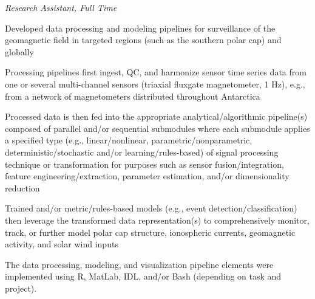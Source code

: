  \par
\textit{Research Assistant, Full Time}
\vspace{-0.8em}
\begin{itemize*}
  \item Developed data processing and modeling pipelines for
    surveillance of the geomagnetic field in targeted regions (such as
    the southern polar cap) and globally
  \item Processing pipelines first ingest, QC, and harmonize sensor time series data
    from one or several multi-channel sensors (triaxial fluxgate 
    magnetometer, 1 Hz), e.g., from a network of magnetometers 
    distributed throughout Antarctica
  \item Processed data is then fed into the appropriate
    analytical/algorithmic pipeline(s) composed of parallel and/or
    sequential submodules where each submodule applies a specified type 
    (e.g., linear/nonlinear, parametric/nonparametric, deterministic/stochastic
    and/or learning/rules-based) of signal processing technique or transformation 
    for purposes such as sensor fusion/integration, feature engineering/extraction,
    parameter estimation, and/or dimensionality reduction
  \item Trained and/or metric/rules-based models (e.g., event
    detection/classification) then leverage the transformed data representation(s)
    to comprehensively monitor, track, or further model polar cap structure,
    ionospheric currents, geomagnetic activity, and solar wind inputs
  \item The data processing, modeling, and visualization pipeline
    elements were implemented using R, MatLab, IDL, and/or Bash
    (depending on task and project).
\end{itemize*}
